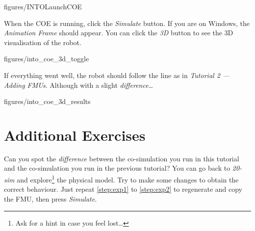 \documentclass[11pt,a4paper]{../tutorial}
\begin{document}
\begin{instructions}
    \begin{annotation}[width=0.85\linewidth,trim=0 270 0 120,clip]{figures/INTOLaunchCOE}
    \end{annotation}

\item When the COE is running, click the \emph{Simulate} button. If you are on Windows, the \emph{Animation Frame} should appear. You can click the \emph{3D} button to see the 3D visualisation of the robot.

    \begin{annotation}[width=0.55\linewidth,trim=0 0 0 0,clip]{figures/into_coe_3d_toggle}
    \end{annotation}

\item If everything went well, the robot should follow the line as in \emph{Tutorial 2 --- Adding FMUs}. Although with a slight \emph{difference}\ldots

    \begin{annotation}[width=0.55\linewidth,trim=0 300 0 0,clip]{figures/into_coe_3d_results}
    \end{annotation}

\end{instructions}

\section{Additional Exercises}

Can you spot the \emph{difference} between the co-simulation you run in this tutorial and the co-simulation you run in the previous tutorial? You can go back to \emph{20-sim} and explore\footnote{Ask for a hint in case you feel lost\ldots} the physical model. Try to make some changes to obtain the correct behaviour. Just repeat \ref{step:exp1} to \ref{step:exp2} to regenerate and copy the FMU, then press \emph{Simulate}.
\end{document}

